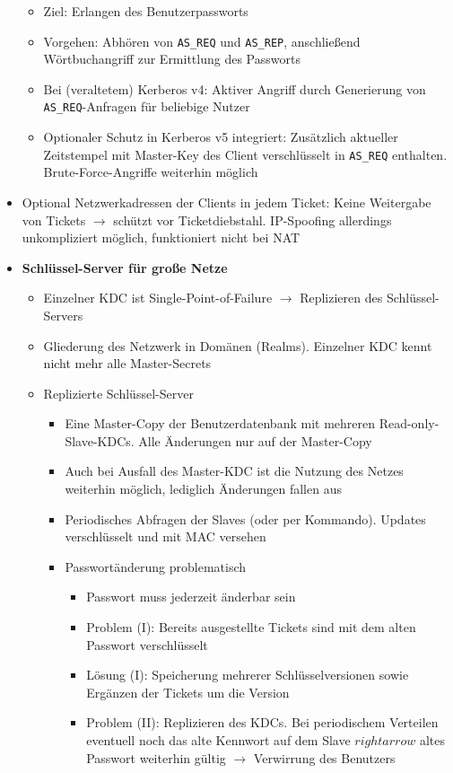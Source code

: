 \begin{itemize}
\begin{itemize}
		\item Ziel: Erlangen des Benutzerpassworts
		\item Vorgehen: Abhören von \texttt{AS\_REQ} und \texttt{AS\_REP}, anschließend Wörtbuchangriff zur Ermittlung des Passworts
		\item Bei (veraltetem) Kerberos v4: Aktiver Angriff durch Generierung von \texttt{AS\_REQ}-Anfragen für beliebige Nutzer
		\item Optionaler Schutz in Kerberos v5 integriert: Zusätzlich aktueller Zeitstempel mit Master-Key des Client verschlüsselt in \texttt{AS\_REQ} enthalten. Brute-Force-Angriffe weiterhin möglich
	\end{itemize}
	\item Optional Netzwerkadressen der Clients in jedem Ticket: Keine Weitergabe von Tickets \(\rightarrow\) schützt vor Ticketdiebstahl. IP-Spoofing allerdings unkompliziert möglich, funktioniert nicht bei NAT
	\item \textbf{Schlüssel-Server für große Netze}
	\begin{itemize}
		\item Einzelner KDC ist Single-Point-of-Failure \(\rightarrow\) Replizieren des Schlüssel-Servers
		\item Gliederung des Netzwerk in Domänen (Realms). Einzelner KDC kennt nicht mehr alle Master-Secrets
		\item Replizierte Schlüssel-Server
		\begin{itemize}
			\item Eine Master-Copy der Benutzerdatenbank mit mehreren Read-only-Slave-KDCs. Alle Änderungen nur auf der Master-Copy
			\item Auch bei Ausfall des Master-KDC ist die Nutzung des Netzes weiterhin möglich, lediglich Änderungen fallen aus
			\item Periodisches Abfragen der Slaves (oder per Kommando). Updates verschlüsselt und mit MAC versehen
			\item Passwortänderung problematisch
			\begin{itemize}
				\item Passwort muss jederzeit änderbar sein
				\item Problem (I): Bereits ausgestellte Tickets sind mit dem alten Passwort verschlüsselt
				\item Lösung (I): Speicherung mehrerer Schlüsselversionen sowie Ergänzen der Tickets um die Version
				\item Problem (II): Replizieren des KDCs. Bei periodischem Verteilen eventuell noch das alte Kennwort auf dem Slave \(rightarrow\) altes Passwort weiterhin gültig \(\rightarrow\) Verwirrung des Benutzers

\end{itemize}
\end{itemize}
\end{itemize}
\end{itemize}
